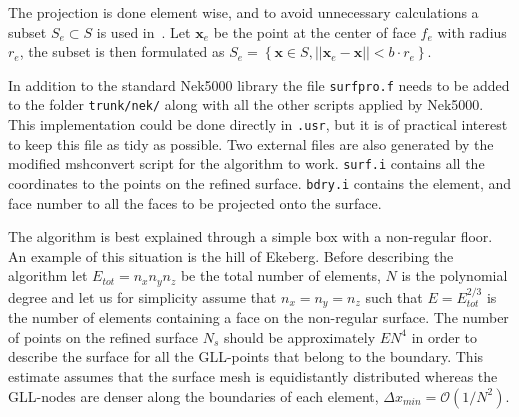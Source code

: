 The projection is done element wise, and to avoid unnecessary calculations a subset $S_e \subset S$
is used in~.
Let $\mathbf{x}_e$ be the point at the center of face $f_e$
with radius $r_e$, the subset is then formulated as  
$S_e = \left\{ \mathbf{x} \in S , ||\mathbf{x}_e-\mathbf{x}|| < b \cdot r_e \right\}$.


In addition to the standard Nek5000 library the file \verb|surfpro.f| needs to be added to 
the folder \verb|trunk/nek/| along with all the other scripts applied by Nek5000.
This implementation could be done directly in \verb|.usr|, but it is of practical 
interest to keep this file as tidy as possible.
Two external files are also generated by the modified mshconvert script for the algorithm to work.
\verb|surf.i| contains all the coordinates to the points on the refined surface. 
\verb|bdry.i| contains the element, and face number to all the faces to be projected onto the surface.

The algorithm is best explained through a simple box with a non-regular floor. 
An example of this situation is the hill of Ekeberg. 
Before describing the algorithm let $E_{tot} = n_xn_yn_z$  be the total number of elements, 
$N$ is the polynomial degree and let us for simplicity assume that $n_x=n_y=n_z$ such that 
$E= E_{tot}^{2/3}$ is the number of elements containing a face on the non-regular surface.
The number of points on the refined surface $N_s$ should be approximately $EN^4$ in 
order to describe the surface for all the GLL-points that belong to the boundary. This estimate
assumes that the surface mesh is equidistantly distributed whereas the GLL-nodes 
are denser along the boundaries of each element, $\Delta x_{min} = \mathcal{O}(1/N^2)$. 

